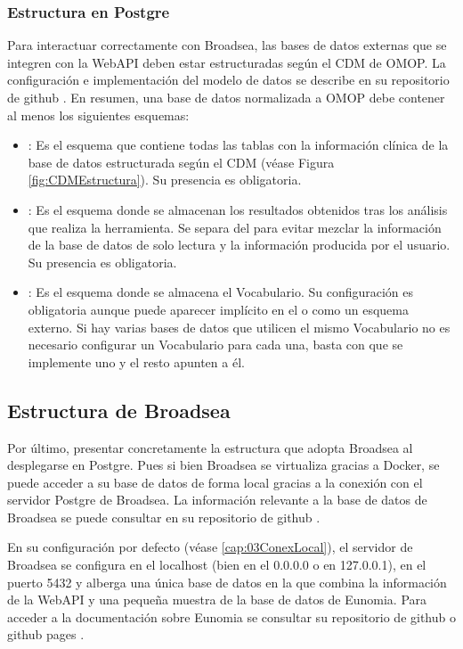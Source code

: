 \subsubsection{Estructura en Postgre}

Para interactuar correctamente con Broadsea, las bases de datos externas que se integren con la WebAPI deben estar estructuradas según el CDM de OMOP. La configuración e implementación del modelo de datos se describe en su repositorio de github \cite{githubCDMConfig}. En resumen, una base de datos normalizada a OMOP debe contener al menos los siguientes esquemas:

\begin{itemize}
    \item {}: Es el esquema que contiene todas las tablas con la información clínica de la base de datos estructurada según el CDM (véase Figura \ref{fig:CDMEstructura}). Su presencia es obligatoria.
    \item {}: Es el esquema donde se almacenan los resultados obtenidos tras los análisis que realiza la herramienta. Se separa del  para evitar mezclar la información de la base de datos de solo lectura y la información producida por el usuario. Su presencia es obligatoria.
    \item {}: Es el esquema donde se almacena el Vocabulario. Su configuración es obligatoria aunque puede aparecer implícito en el  o como un esquema externo. Si hay varias bases de datos que utilicen el mismo Vocabulario no es necesario configurar un Vocabulario para cada una, basta con que se implemente uno y el resto apunten a él.
\end{itemize}

\subsection{Estructura de Broadsea}

Por último, presentar concretamente la estructura que adopta Broadsea al desplegarse en Postgre. Pues si bien Broadsea se virtualiza gracias a Docker, se puede acceder a su base de datos de forma local gracias a la conexión con el servidor Postgre de Broadsea. La información relevante a la base de datos de Broadsea se puede consultar en su repositorio de github \cite{githubBroadseaDB}.

En su configuración por defecto (véase \ref{cap:03ConexLocal}), el servidor de Broadsea se configura en el localhost (bien en el 0.0.0.0  o en 127.0.0.1), en el puerto 5432 \cite{githubBroadseaDB} y alberga una única base de datos en la que combina la información de la WebAPI y una pequeña muestra de la base de datos de Eunomia. Para acceder a la documentación sobre Eunomia se consultar su repositorio de github \cite{githubEunomia} o github pages \cite{githubPagesEunomia}.

